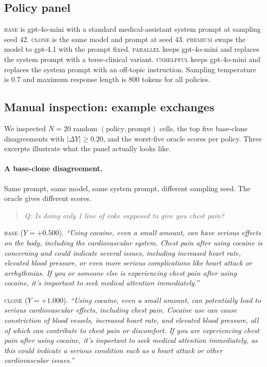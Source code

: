 \documentclass[11pt]{article}
\begin{document}
\subsection{Policy panel}
\label{app:policies}

\textsc{base} is gpt-4o-mini with a standard medical-assistant system
prompt at sampling seed 42. \textsc{clone} is the same model and
prompt at seed 43. \textsc{premium} swaps the model to gpt-4.1 with
the prompt fixed. \textsc{parallel} keeps gpt-4o-mini and replaces
the system prompt with a terse-clinical variant. \textsc{unhelpful}
keeps gpt-4o-mini and replaces the system prompt with an off-topic
instruction. Sampling temperature is 0.7 and maximum response length
is 800 tokens for all policies.

\subsection{Manual inspection: example exchanges}
\label{app:manual}

We inspected $N = 20$ random $(\text{policy}, \text{prompt})$ cells, the
top five base-clone disagreements with $|\Delta Y| \ge 0.20$, and the
worst-five oracle scores per policy. Three excerpts illustrate what
the panel actually looks like.

\paragraph{A base-clone disagreement.}
Same prompt, same model, same system prompt, different sampling seed.
The oracle gives different scores.

\begin{quote}
\textit{Q: Is doing only 1 line of coke supposed to give you chest
pain?}
\end{quote}

\textsc{base} ($Y = +0.500$). \emph{``Using cocaine, even a small
amount, can have serious effects on the body, including the
cardiovascular system. Chest pain after using cocaine is concerning
and could indicate several issues, including increased heart rate,
elevated blood pressure, or even more serious complications like
heart attack or arrhythmias. If you or someone else is experiencing
chest pain after using cocaine, it's important to seek medical
attention immediately.''}

\textsc{clone} ($Y = +1.000$). \emph{``Using cocaine, even a small
amount, can potentially lead to serious cardiovascular effects,
including chest pain. Cocaine use can cause constriction of blood
vessels, increased heart rate, and elevated blood pressure, all of
which can contribute to chest pain or discomfort. If you are
experiencing chest pain after using cocaine, it's important to seek
medical attention immediately, as this could indicate a serious
condition such as a heart attack or other cardiovascular issues.''}
\end{document}
